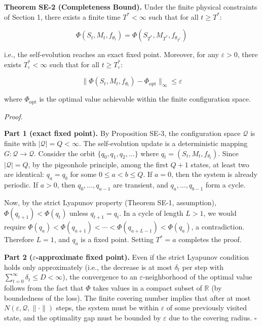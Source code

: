 \documentclass[
  12pt,
]{ctexart}
\begin{document}
\textbf{Theorem SE-2 (Completeness Bound).} Under the finite physical
constraints of Section 1, there exists a finite time \(T^* < \infty\)
such that for all \(t \geq T^*\):

\[\Phi(S_t, M_t, f_{\theta_t}) = \Phi(S_{T^*}, M_{T^*}, f_{\theta_{T^*}})\]

i.e., the self-evolution reaches an exact fixed point. Moreover, for any
\(\varepsilon > 0\), there exists \(T_\varepsilon^* < \infty\) such that
for all \(t \geq T_\varepsilon^*\):

\[\|\Phi(S_t, M_t, f_{\theta_t}) - \Phi_{\text{opt}}\|_\infty \leq \varepsilon\]

where \(\Phi_{\text{opt}}\) is the optimal value achievable within the
finite configuration space.

\emph{Proof.}

\textbf{Part 1 (exact fixed point).} By Proposition SE-3, the
configuration space \(\mathcal{Q}\) is finite with
\(|\mathcal{Q}| = Q < \infty\). The self-evolution update is a
deterministic mapping \(G: \mathcal{Q} \to \mathcal{Q}\). Consider the
orbit \(\{q_0, q_1, q_2, \ldots\}\) where
\(q_t = (S_t, M_t, f_{\theta_t})\). Since \(|\mathcal{Q}| = Q\), by the
pigeonhole principle, among the first \(Q+1\) states, at least two are
identical: \(q_a = q_b\) for some \(0 \leq a < b \leq Q\). If \(a = 0\),
then the system is already periodic. If \(a > 0\), then
\(q_0, \ldots, q_{a-1}\) are transient, and \(q_a, \ldots, q_{b-1}\)
form a cycle.

Now, by the strict Lyapunov property (Theorem SE-1, assumption),
\(\Phi(q_{t+1}) < \Phi(q_t)\) unless \(q_{t+1} = q_t\). In a cycle of
length \(L > 1\), we would require
\(\Phi(q_a) < \Phi(q_{a+1}) < \cdots < \Phi(q_{a+L-1}) < \Phi(q_a)\), a
contradiction. Therefore \(L = 1\), and \(q_a\) is a fixed point.
Setting \(T^* = a\) completes the proof.

\textbf{Part 2 (\(\varepsilon\)-approximate fixed point).} Even if the
strict Lyapunov condition holds only approximately (i.e., the decrease
is at most \(\delta_t\) per step with
\(\sum_{t=0}^\infty \delta_t \leq D < \infty\)), the convergence to an
\(\varepsilon\)-neighborhood of the optimal value follows from the fact
that \(\Phi\) takes values in a compact subset of \(\mathbb{R}\) (by
boundedness of the loss). The finite covering number implies that after
at most \(N(\varepsilon, \mathcal{Q}, \|\cdot\|)\) steps, the system
must be within \(\varepsilon\) of some previously visited state, and the
optimality gap must be bounded by \(\varepsilon\) due to the covering
radius. \(\square\)
\end{document}
